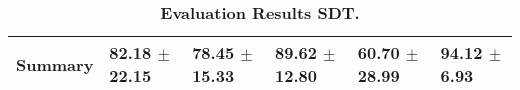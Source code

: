\begin{table}[htb]
{\begin{tabular}{llllll}
\midrule
\textbf{Summary                                  } &                  \phantom{0}82.18 $\pm$ 22.15 &                      \phantom{0}78.45 $\pm$ 15.33 &                  \phantom{0}89.62 $\pm$ 12.80 &            \phantom{0}60.70 $\pm$ 28.99 &  \phantom{0}94.12 $\pm$ \phantom{0}6.93 \\
\bottomrule
\end{tabular}%
}
\caption{\textbf{Evaluation Results SDT.}}
\label{tab:eval-results}
\end{table}
\newpage 
